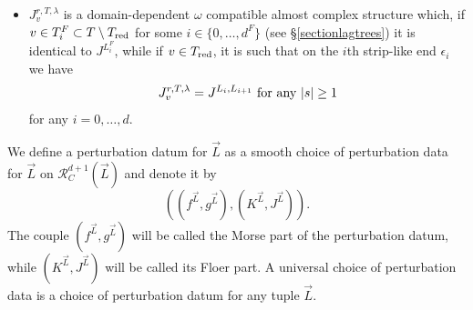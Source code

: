 \begin{dfn}
\begin{itemize}
\begin{itemize}
			\item $J^{r,T,\lambda}_v$ is a domain-dependent $\omega$ compatible almost complex structure which, if $v\in T_i^F\subset T\setminus T_\textnormal{red}$ for some $i\in \{0,\ldots, d^F\}$ (see \S \ref{sectionlagtrees}) it is identical to $J^{L_i^F}$, while if $v\in T_\textnormal{red}$, it is such that on the $i$th strip-like end $\epsilon_i$ we have $$J^{r,T,\lambda}_v=J^{L_i,L_{i+1}} \textnormal{ for any }|s|\geq 1$$ for any $i=0,\ldots, d$.
		\end{itemize}
	\end{itemize}
	We define a perturbation datum for $\vec{L}$ as a smooth choice of perturbation data for $\vec{L}$ on $\mathcal{R}^{d+1}_C(\vec{L})$ and denote it by $$\left((f^{\vec{L}},g^{\vec{L}}),(K^{\vec{L}},J^{\vec{L}})\right).$$ The couple $(f^{\vec{L}},g^{\vec{L}})$ will be called the Morse part of the perturbation datum, while $(K^{\vec{L}},J^{\vec{L}})$ will be called its Floer part. A universal choice of perturbation data is a choice of perturbation datum for any tuple $\vec{L}$.
\end{dfn}

